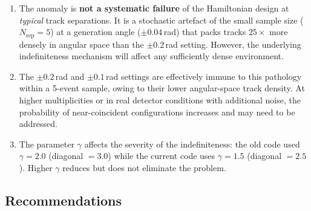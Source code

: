 \documentclass[12pt,a4paper]{article}
\begin{document}
\begin{enumerate}
  \item The anomaly is \textbf{not a systematic failure} of the Hamiltonian
        design at \emph{typical} track separations.
        It is a stochastic artefact of the small sample size
        ($N_\text{rep}=5$) at a generation angle ($\pm0.04$\,rad) that
        packs tracks $25\times$ more densely in angular space than the
        $\pm0.2$\,rad setting.
        However, the underlying indefiniteness mechanism will affect any
        sufficiently dense environment.

  \item The $\pm0.2$\,rad and $\pm0.1$\,rad settings are effectively immune
        to this pathology within a 5-event sample, owing to their lower
        angular-space track density.
        At higher multiplicities or in real detector conditions with
        additional noise, the probability of near-coincident configurations
        increases and may need to be addressed.

  \item The parameter $\gamma$ affects the severity of the indefiniteness:
        the old code used $\gamma = 2.0$ (diagonal $= 3.0$) while the current
        code uses $\gamma = 1.5$ (diagonal $= 2.5$).
        Higher $\gamma$ reduces but does not eliminate the problem.
\end{enumerate}

\subsection*{Recommendations}
\end{document}
